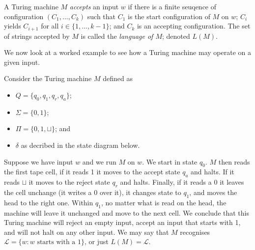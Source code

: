 A Turing machine $M$ \emph{accepts} an input $w$ if there is a finite seuqence of configuration $(C_1, \ldots, C_k)$ such that $C_1$ is the start configuration of $M$ on $w$; $C_i$ yields $C_{i+1}$ for all $i \in \{1, \ldots, k-1\}$; and $C_k$ is an accepting configuration. The set of strings accepted by $M$ is called the \emph{language of $M$}; denoted $L(M)$.

We now look at a worked example to see how a Turing machine may operate on a given input.

\begin{example}
  Consider the Turing machine $M$ defined as
  \begin{itemize}
    \item $Q = \{q_0, q_1, q_r, q_a\}$;
    \item $\Sigma = \{0, 1\}$;
    \item $\Pi = \{0, 1, \sqcup\}$; and
    \item $\delta$ as decribed in the state diagram below.
  \end{itemize}
  \begin{center}
  \end{center}
  Suppose we have input $w$ and we run $M$ on $w$. We start in state $q_0$. $M$ then reads the first tape cell, if it reads 1 it moves to the accept state $q_a$ and halts. If it reads $\sqcup$ it moves to the reject state $q_r$ and halts. Finally, if it reads a $0$ it leaves the cell unchange (it writes a 0 over it), it changes state to $q_1$, and moves the head to the right one. Within $q_1$, no matter what is read on the head, the machine will leave it unchanged and move to the next cell. We conclude that this Turing machine will reject an empty input, accept an input that starts with 1, and will not halt on any other input. We may say that $M$ recognises $\mathcal L = \{w : \text{$w$ starts with a 1}\}$, or just $L(M) = \mathcal L$.
\end{example}

